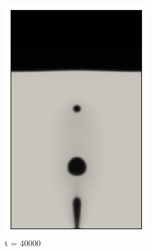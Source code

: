 \begin{figure}[H]
	\medskip
	\begin{subfigure}{0.25\textwidth}
		\includegraphics[width=\linewidth]{figs/cap4/cuda_bb_760_d40}
		\caption{t = 40000}
		\label{fig:7}
	\end{subfigure}\hfil
	\begin{subfigure}{0.25\textwidth}

\end{subfigure}
\end{figure}
